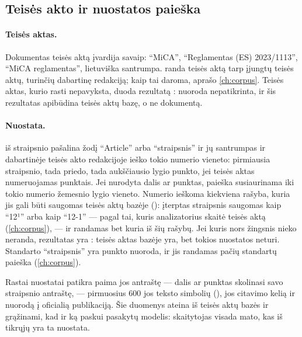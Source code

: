\subsection{Teisės akto ir nuostatos paieška}\label{sec:company:locate}

\paragraph{Teisės aktas.} Dokumentas teisės aktą įvardija savaip: \enquote{MiCA},
\enquote{Reglamentas (ES) 2023/1113}, \enquote{MiCA reglamentas}, lietuviška santrumpa.
 randa teisės aktą tarp įjungtų teisės aktų, turinčių dabartinę
redakciją; kaip tai daroma, aprašo \cref{ch:corpus}. Teisės aktas, kurio rasti nepavyksta,
duoda rezultatą : nuoroda nepatikrinta, ir šis rezultatas apibūdina
teisės aktų bazę, o ne dokumentą.

\paragraph{Nuostata.}  iš straipsnio pašalina žodį \enquote{Article} arba
\enquote{straipsnis} ir jų santrumpas ir dabartinėje teisės akto redakcijoje ieško tokio
numerio vieneto: pirmiausia straipsnio, tada priedo, tada aukščiausio lygio punkto, jei teisės
aktas numeruojamas punktais. Jei nurodyta dalis ar punktas, paieška susiaurinama iki tokio
numerio žemesnio lygio vieneto. Numerio ieškoma kiekviena rašyba, kuria jis gali būti saugomas
teisės aktų bazėje (): įterptas straipsnis saugomas kaip \enquote{12¹}
arba kaip \enquote{12-1} --- pagal tai, kuris analizatorius skaitė teisės aktą
(\cref{ch:corpus}), --- ir randamas bet kuria iš šių rašybų. Jei kuris nors žingsnis nieko neranda, rezultatas yra
: teisės aktas bazėje yra, bet tokios nuostatos neturi. Standarto
\enquote{straipsnis} yra punkto nuoroda, ir jis randamas pačių standartų paieška
(\cref{ch:corpus}).

Rastai nuostatai patikra paima jos antraštę --- dalis ar punktas skolinasi savo straipsnio
antraštę, --- pirmuosius 600 jos teksto simbolių (), jos citavimo kelią ir
nuorodą į oficialią publikaciją. Šie duomenys ateina iš teisės aktų bazės ir grąžinami, kad ir
ką paskui pasakytų modelis: skaitytojas visada mato, kas iš tikrųjų yra ta nuostata.

